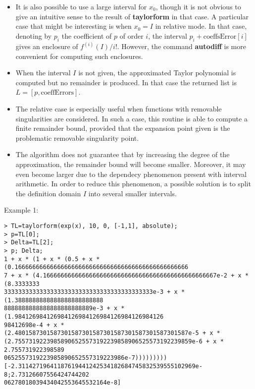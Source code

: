 \begin{itemize}
\item It is also possible to use a large interval for $x_0$, though it is not obvious to give an intuitive sense to the result of \textbf{taylorform} in that case. A particular case that might be interesting is when $x_0 = I$ in relative mode. In that case, denoting by $p_i$ the coefficient of $p$ of order $i$, the interval $p_i + \textrm{coeffsError}[i]$ gives an enclosure of $f^{(i)}(I)/i!$. However, the command \textbf{autodiff} is more convenient for computing such enclosures.

\item When the interval $I$ is not given, the approximated Taylor polynomial is computed but no remainder is produced. In that case the returned list is $L = \left[p, \textrm{coeffErrors}\right]$.

\item The relative case is especially useful when functions with removable singularities are considered. In such a case, this routine is able to compute a finite remainder bound, provided that the expansion point given is the problematic removable singularity point.

\item The algorithm does not guarantee that by increasing the degree of the approximation, the remainder bound will become smaller. Moreover, it may 
   even become larger due to the dependecy phenomenon present with interval arithmetic. In order to reduce this phenomenon, a possible solution is to split the definition domain $I$ into several smaller intervals. 
\end{itemize}
\noindent Example 1: 
\begin{center}\begin{minipage}{15cm}\begin{Verbatim}[frame=single]
> TL=taylorform(exp(x), 10, 0, [-1,1], absolute);
> p=TL[0];
> Delta=TL[2];
> p; Delta;
1 + x * (1 + x * (0.5 + x * (0.1666666666666666666666666666666666666666666666666
7 + x * (4.1666666666666666666666666666666666666666666666667e-2 + x * (8.3333333
333333333333333333333333333333333333333333e-3 + x * (1.3888888888888888888888888
8888888888888888888888889e-3 + x * (1.984126984126984126984126984126984126984126
98412698e-4 + x * (2.4801587301587301587301587301587301587301587301587e-5 + x * 
(2.75573192239858906525573192239858906525573192239859e-6 + x * 2.755731922398589
0652557319223985890652557319223986e-7)))))))))
[-2.31142719641187619441242534182684745832539555102969e-8;2.73126607556424744202
06278018039434042553645532164e-8]
\end{Verbatim}
\end{minipage}\end{center}
